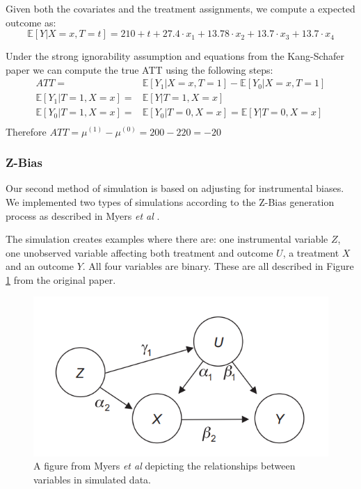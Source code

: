 \documentclass{article}
\begin{document}
Given both the covariates and the treatment assignments, we compute a expected outcome as:
\begin{equation*}
    \mathbb{E}[Y|X=x, T=t] = 210 + t + 27.4 \cdot{} x_1 + 13.78 \cdot{} x_2 + 13.7 \cdot{} x_3 + 13.7 \cdot{} x_4
\end{equation*}

Under the strong ignorability assumption and equations from the Kang-Schafer paper we can compute the true ATT using the following steps:
\begin{equation*}
    \begin{split}
        ATT = & \mathbb{E}[Y_1 | X=x, T=1] - \mathbb{E}[Y_0 | X=x, T=1] \\
        \mathbb{E}[Y_1|T=1, X=x] = & \mathbb{E}[Y|T=1, X=x] \\
        \mathbb{E}[Y_0|T=1, X=x] = & \mathbb{E}[Y_0|T=0, X=x] = \mathbb{E}[Y|T=0, X=x] \\
    \end{split}
\end{equation*}
Therefore $ATT=\mu{}^{(1)} - \mu{}^{(0)} = 200-220 = -20$ 

\subsubsection{Z-Bias}
Our second method of simulation is based on adjusting for instrumental biases. We implemented two types of simulations according to the Z-Bias generation process as described in Myers \textit{et al} \cite{myers2011effects}.

The simulation creates examples where there are: one instrumental variable $Z$, one unobserved variable affecting both treatment and outcome $U$, a treatment $X$ and an outcome $Y$. All four variables are binary. These are all described in Figure \ref{fig:z_bias_explanation} from the original paper.

\begin{figure}
    \centering
    \includegraphics[width=\textwidth]{Paper/images/z_bias_schema_complex.png}
    \caption{A figure from Myers \textit{et al} depicting the relationships between variables in simulated data.}
    \label{fig:z_bias_explanation}
\end{figure} 
\end{document}
